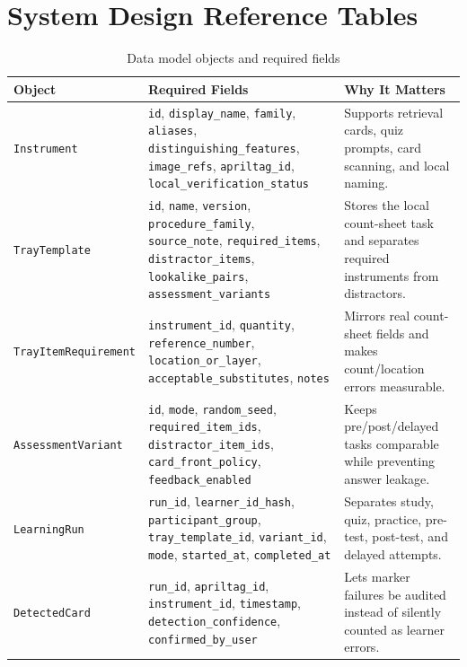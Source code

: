 \documentclass[10pt,a4paper]{article}
\begin{document}
\newpage
\section{System Design Reference Tables}
\label{app:system-design-reference-tables}

\begin{table}[H]
\centering
\caption{Data model objects and required fields}
\label{tab:app-data-model-objects}
\small\renewcommand{\arraystretch}{1.2}\setlength{\tabcolsep}{4pt}
\begin{tabularx}{\textwidth}{|>{\raggedright\arraybackslash}X|>{\raggedright\arraybackslash}X|>{\raggedright\arraybackslash}X|}
\hline
Object & Required Fields & Why It Matters \\
\hline
\texttt{Instrument} & \texttt{id}, \texttt{display\_name}, \texttt{family}, \texttt{aliases}, \texttt{distinguishing\_features}, \texttt{image\_refs}, \texttt{apriltag\_id}, \texttt{local\_verification\_status} & Supports retrieval cards, quiz prompts, card scanning, and local naming. \\
\hline
\texttt{TrayTemplate} & \texttt{id}, \texttt{name}, \texttt{version}, \texttt{procedure\_family}, \texttt{source\_note}, \texttt{required\_items}, \texttt{distractor\_items}, \texttt{lookalike\_pairs}, \texttt{assessment\_variants} & Stores the local count-sheet task and separates required instruments from distractors. \\
\hline
\texttt{TrayItemRequirement} & \texttt{instrument\_id}, \texttt{quantity}, \texttt{reference\_number}, \texttt{location\_or\_layer}, \texttt{acceptable\_substitutes}, \texttt{notes} & Mirrors real count-sheet fields and makes count/location errors measurable. \\
\hline
\texttt{AssessmentVariant} & \texttt{id}, \texttt{mode}, \texttt{random\_seed}, \texttt{required\_item\_ids}, \texttt{distractor\_item\_ids}, \texttt{card\_front\_policy}, \texttt{feedback\_enabled} & Keeps pre/post/delayed tasks comparable while preventing answer leakage. \\
\hline
\texttt{LearningRun} & \texttt{run\_id}, \texttt{learner\_id\_hash}, \texttt{participant\_group}, \texttt{tray\_template\_id}, \texttt{variant\_id}, \texttt{mode}, \texttt{started\_at}, \texttt{completed\_at} & Separates study, quiz, practice, pre-test, post-test, and delayed attempts. \\
\hline
\texttt{DetectedCard} & \texttt{run\_id}, \texttt{apriltag\_id}, \texttt{instrument\_id}, \texttt{timestamp}, \texttt{detection\_confidence}, \texttt{confirmed\_by\_user} & Lets marker failures be audited instead of silently counted as learner errors. \\

\end{tabularx}
\end{table}
\end{document}
